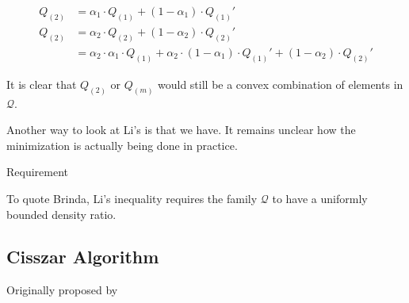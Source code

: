\begin{align*}
    Q_{(2)} & = \alpha_1 \cdot Q_{(1)} + (1 - \alpha_1)\cdot Q_{(1)}' \\
    Q_{(2)} & = \alpha_2 \cdot Q_{(2)} + (1 - \alpha_2)\cdot Q_{(2)}' \\
            & = \alpha_2 \cdot \alpha_1 \cdot Q_{(1)} +
    \alpha_2 \cdot (1 - \alpha_1) \cdot Q_{(1)}' +
    (1 - \alpha_2)\cdot Q_{(2)}'
\end{align*}


It is clear that $Q_{(2)}$ or $Q_{(m)}$ would still be a convex combination of
elements in $\mathcal{Q}$.

Another way to look at Li's is that we have. It remains unclear how the
minimization is actually being done in practice.

Requirement

To quote Brinda, Li's inequality requires the family $\mathcal{Q}$ to have a
uniformly bounded density ratio.

\subsection{Cisszar Algorithm}

Originally proposed by